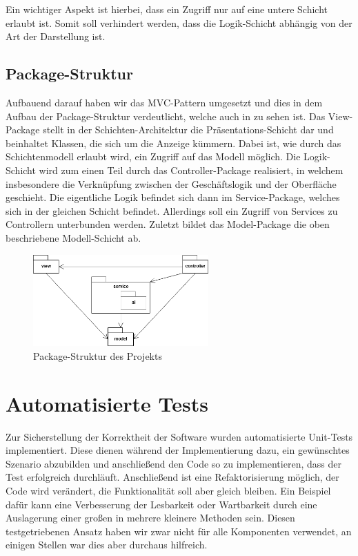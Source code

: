 Ein wichtiger Aspekt ist hierbei, dass ein Zugriff nur auf eine untere Schicht erlaubt ist.
Somit soll verhindert werden, dass die Logik-Schicht \bspw abhängig von der Art der Darstellung ist. \\

\subsection{Package-Struktur}
\label{subsec:package-struktur}

Aufbauend darauf haben wir das \ac{MVC}-Pattern umgesetzt und dies in dem Aufbau der Package-Struktur verdeutlicht,
welche auch in  zu sehen ist.
Das View-Package stellt in der Schichten-Architektur die Präsentations-Schicht dar und beinhaltet Klassen, die sich um
die Anzeige kümmern.
Dabei ist, wie durch das Schichtenmodell erlaubt wird, ein Zugriff auf das Modell möglich.
Die Logik-Schicht wird zum einen Teil durch das Controller-Package realisiert, in welchem insbesondere die Verknüpfung
zwischen der Geschäftslogik und der Oberfläche geschieht.
Die eigentliche Logik befindet sich dann im Service-Package, welches sich in der gleichen Schicht befindet.
Allerdings soll ein Zugriff von Services zu Controllern unterbunden werden.
Zuletzt bildet das Model-Package die oben beschriebene Modell-Schicht ab.

\begin{figure}[htb]
\centering
\includegraphics[width=0.6\textwidth]{Bilder/Diagramm_Paketstruktur.png}
\caption{Package-Struktur des Projekts}
\label{fig:package-struktur}
\end{figure}

\section{Automatisierte Tests}
\label{sec:tests}

Zur Sicherstellung der Korrektheit der Software wurden automatisierte Unit-Tests  implementiert.
Diese dienen während der Implementierung dazu, ein gewünschtes Szenario abzubilden und anschließend den Code so zu
implementieren, dass der Test erfolgreich durchläuft.
Anschließend ist eine Refaktorisierung möglich, \dasheisst der Code wird verändert, die Funktionalität soll aber gleich
bleiben.
Ein Beispiel dafür kann eine Verbesserung der Lesbarkeit oder Wartbarkeit durch eine Auslagerung einer großen in
mehrere kleinere Methoden sein.
Diesen testgetriebenen Ansatz  haben wir zwar nicht für alle Komponenten verwendet, an einigen Stellen war dies
aber durchaus hilfreich. \\

